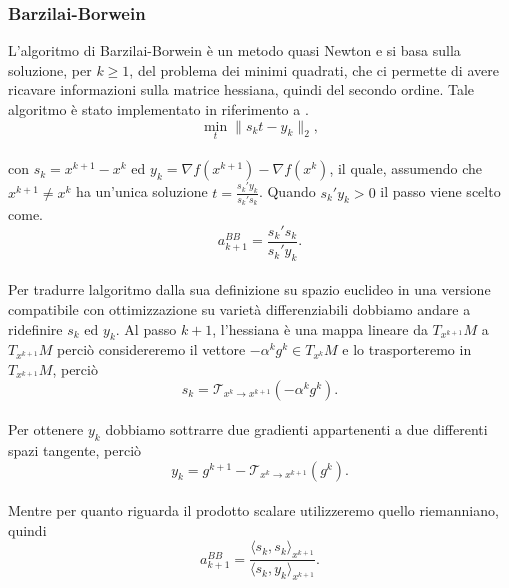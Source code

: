 \documentclass[a4paper, 12pt]{article}
\begin{document}
\subsubsection{Barzilai-Borwein}
L'algoritmo di Barzilai-Borwein è un metodo quasi Newton e si basa sulla soluzione, per $k \geq 1$, del problema dei minimi quadrati, che ci permette di avere ricavare informazioni sulla matrice hessiana, quindi del secondo ordine. Tale algoritmo è stato implementato in riferimento a \cite{Iannazzo}.\\
\[\min_{t} \parallel s_kt - y_k \parallel_2,\]\\
con $s_k = x^{k+1} - x^k$ ed $y_k = \nabla f(x^{k+1}) - \nabla f(x^k)$, il quale, assumendo che $x^{k+1} \neq x^k$ ha un'unica soluzione $t = \frac{s_k'y_k}{s_k's_k}$. Quando $s_k'y_k > 0$ il passo viene scelto come.\\
\[a_{k+1}^{BB} = \frac{s_k's_k}{s_k'y_k}.\]\\
Per tradurre lalgoritmo dalla sua definizione su spazio euclideo in una versione compatibile con ottimizzazione su varietà differenziabili dobbiamo andare a ridefinire $s_k$ ed $y_k$. Al passo $k+1$, l'hessiana è una mappa lineare da $T_{x^{k+1}}M$ a $T_{x^{k+1}}M$ perciò considereremo il vettore $-\alpha^kg^k \in T_{x^k}M$ e lo trasporteremo in $T_{x^{k+1}}M$, perciò\\
\[s_k = \mathcal{T}_{x^k \to x^{k+1}}(-\alpha^kg^k).\]\\
Per ottenere $y_k$ dobbiamo sottrarre due gradienti appartenenti a due differenti spazi tangente, perciò
\[y_k = g^{k+1} - \mathcal{T}_{x^k \to x^{k+1}}(g^k).\]\\
Mentre per quanto riguarda il prodotto scalare utilizzeremo quello riemanniano, quindi\\
\[a_{k+1}^{BB} = \frac{\langle s_k,s_k \rangle_{x^{k+1}}}{\langle s_k,y_k \rangle_{x^{k+1}}}.\]\\
\end{document}
